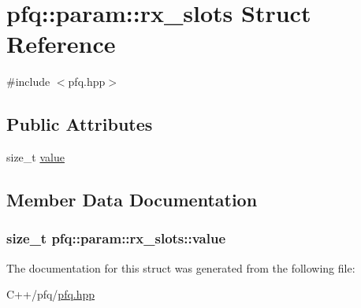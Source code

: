 \hypertarget{structpfq_1_1param_1_1rx__slots}{}\section{pfq\+:\+:param\+:\+:rx\+\_\+slots Struct Reference}
\label{structpfq_1_1param_1_1rx__slots}


{\ttfamily \#include $<$pfq.\+hpp$>$}

\subsection*{Public Attributes}
\begin{DoxyCompactItemize}
\item 
size\+\_\+t \hyperlink{structpfq_1_1param_1_1rx__slots_a2bafbed5d322cf89df33ca10bc397822}{value}
\end{DoxyCompactItemize}


\subsection{Member Data Documentation}
\subsubsection[{\texorpdfstring{value}{value}}]{\setlength{\rightskip}{0pt plus 5cm}size\+\_\+t pfq\+::param\+::rx\+\_\+slots\+::value}\hypertarget{structpfq_1_1param_1_1rx__slots_a2bafbed5d322cf89df33ca10bc397822}{}\label{structpfq_1_1param_1_1rx__slots_a2bafbed5d322cf89df33ca10bc397822}


The documentation for this struct was generated from the following file\+:\begin{DoxyCompactItemize}
\item 
C++/pfq/\hyperlink{pfq_8hpp}{pfq.\+hpp}\end{DoxyCompactItemize}
